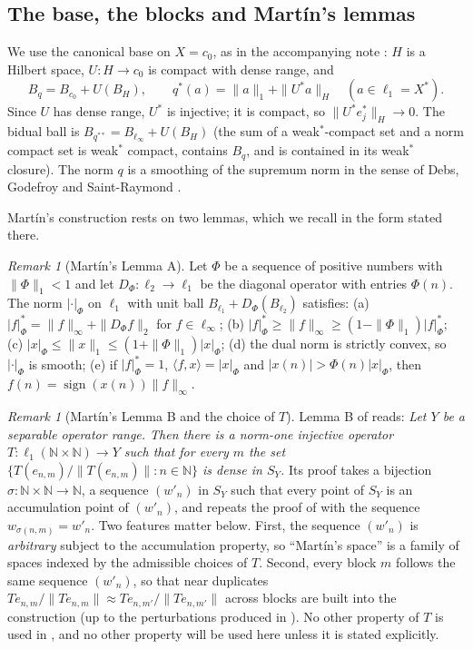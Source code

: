 \documentclass[10pt]{amsart}
\theoremstyle{definition}
\theoremstyle{remark}
\newtheorem{remark}[theorem]{Remark}
\newcommand{\sgn}{\operatorname{sign}}
\newcommand{\N}{\mathbb N}
\newcommand{\ip}[2]{\langle #1,#2\rangle}
\begin{document}
\subsection{The base, the blocks and Mart\'in's lemmas}
We use the canonical base on $X=c_0$, as in the accompanying note
\cite{PrA}: $H$ is a Hilbert space, $U:H\to c_0$ is compact with dense
range, and
\[
 B_q=B_{c_0}+U(B_H),\qquad q^*(a)=\|a\|_1+\|U^*a\|_H\quad(a\in\ell_1=X^*).
\]
Since $U$ has dense range, $U^*$ is injective; it is compact, so
$\|U^*e_j^*\|_H\to0$.  The bidual ball is $B_{q^{**}}=B_{\ell_\infty}+U(B_H)$
(the sum of a weak$^*$-compact set and a norm compact set is weak$^*$
compact, contains $B_q$, and is contained in its weak$^*$ closure).  The
norm $q$ is a smoothing of the supremum norm in the sense of
Debs, Godefroy and Saint-Raymond \cite{DGS}.

Mart\'in's construction \cite{Martin} rests on two lemmas, which we recall
in the form stated there.

\begin{remark}[Mart\'in's Lemma A]\label{rem:lemmaA}
Let $\Phi$ be a sequence of positive numbers with $\|\Phi\|_1<1$ and let
$D_\Phi:\ell_2\to\ell_1$ be the diagonal operator with entries $\Phi(n)$.
The norm $|\cdot|_\Phi$ on $\ell_1$ with unit ball
$B_{\ell_1}+D_\Phi(B_{\ell_2})$ satisfies:
(a) $|f|_\Phi^*=\|f\|_\infty+\|D_\Phi f\|_2$ for $f\in\ell_\infty$;
(b) $|f|^*_\Phi\geq\|f\|_\infty\geq(1-\|\Phi\|_1)|f|^*_\Phi$;
(c) $|x|_\Phi\leq\|x\|_1\leq(1+\|\Phi\|_1)|x|_\Phi$;
(d) the dual norm is strictly convex, so $|\cdot|_\Phi$ is smooth;
(e) if $|f|^*_\Phi=1$, $\ip{f}{x}=|x|_\Phi$ and $|x(n)|>\Phi(n)|x|_\Phi$,
then $f(n)=\sgn(x(n))\|f\|_\infty$.
\end{remark}

\begin{remark}[Mart\'in's Lemma B and the choice of $T$]\label{rem:lemmaB}
Lemma B of \cite{Martin} reads: \emph{Let $Y$ be a separable operator
range.  Then there is a norm-one injective operator
$T:\ell_1(\N\times\N)\to Y$ such that for every $m$ the set
$\{T(e_{n,m})/\|T(e_{n,m})\|:n\in\N\}$ is dense in $S_Y$.}
Its proof takes a bijection $\sigma:\N\times\N\to\N$, a sequence
$(w'_n)$ in $S_Y$ such that every point of $S_Y$ is an accumulation point
of $(w'_n)$, and repeats the proof of \cite[Proposition~2.8]{KLMW20} with
the sequence $w_{\sigma(n,m)}=w'_n$.  Two features matter below.  First,
the sequence $(w'_n)$ is \emph{arbitrary} subject to the accumulation
property, so ``Mart\'in's space'' is a family of spaces indexed by the
admissible choices of $T$.  Second, every block $m$ follows the same
sequence $(w'_n)$, so that near duplicates $Te_{n,m}/\|Te_{n,m}\|\approx
Te_{n,m'}/\|Te_{n,m'}\|$ across blocks are built into the construction (up
to the perturbations produced in \cite{KLMW20}).  No other property of $T$
is used in \cite{Martin}, and no other property will be used here unless
it is stated explicitly.
\end{remark}
\end{document}
